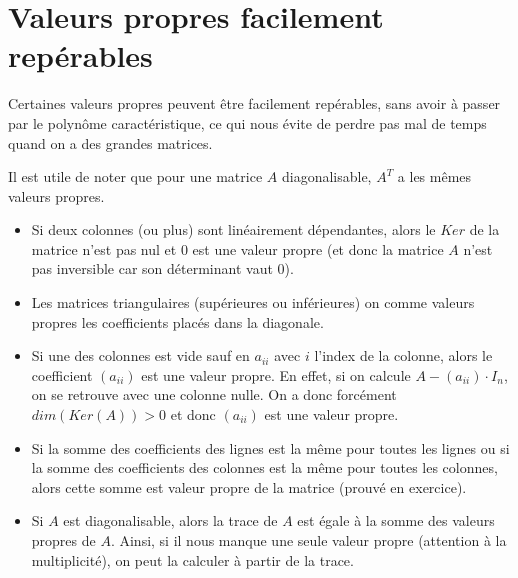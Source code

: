 \documentclass[10pt,a4paper]{book}
\begin{document}
\section{Valeurs propres facilement repérables}
Certaines valeurs propres peuvent être facilement repérables, sans avoir à passer par le polynôme caractéristique, ce qui nous évite de perdre pas mal de temps quand on a des grandes matrices. \par 
Il est utile de noter que pour une matrice $A$ diagonalisable, $A^T$ a les mêmes valeurs propres.
\begin{itemize}
\item Si deux colonnes (ou plus) sont linéairement dépendantes, alors le $Ker$ de la matrice n'est pas nul et 0 est une valeur propre (et donc la matrice $A$ n'est pas inversible car son déterminant vaut 0). 
\item Les matrices triangulaires (supérieures ou inférieures) on comme valeurs propres les coefficients placés dans la diagonale.
\item Si une des colonnes est vide sauf en $a_{ii}$ avec $i$ l'index de la colonne, alors le coefficient $(a_{ii})$ est une valeur propre. En effet, si on calcule $A-(a_{ii})\cdot I_n$, on se retrouve avec une colonne nulle. On a donc forcément $dim(Ker(A)) > 0$ et donc $(a_{ii})$ est une valeur propre. 
\item Si la somme des coefficients des lignes est la même pour toutes les lignes ou si la somme des coefficients des colonnes est la même pour toutes les colonnes, alors cette somme est valeur propre de la matrice (prouvé en exercice).
\item Si $A$ est diagonalisable, alors la trace de $A$ est égale à la somme des valeurs propres de $A$. Ainsi, si il nous manque une seule valeur propre (attention à la multiplicité), on peut la calculer à partir de la trace.
\end{itemize}
\end{document}
